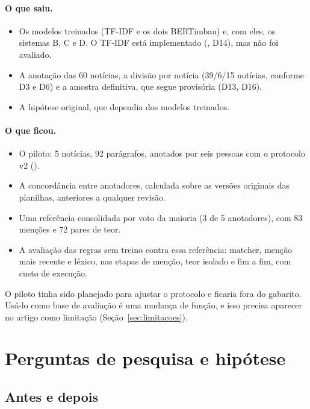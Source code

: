 \documentclass[11pt,a4paper]{article}
\begin{document}
\paragraph{O que saiu.}
\begin{itemize}
\item Os modelos treinados (TF-IDF e os dois BERTimbau) e, com eles, os sistemas B, C e D. O TF-IDF está implementado (, D14), mas não foi avaliado.
\item A anotação das 60 notícias, a divisão por notícia (39/6/15 notícias, conforme D3 e D6) e a amostra definitiva, que segue provisória (D13, D16).
\item A hipótese original, que dependia dos modelos treinados.
\end{itemize}

\paragraph{O que ficou.}
\begin{itemize}
\item O piloto: 5 notícias, 92 parágrafos, anotados por seis pessoas com o protocolo v2 ().
\item A concordância entre anotadores, calculada sobre as versões originais das planilhas, anteriores a qualquer revisão.
\item Uma referência consolidada por voto da maioria (3 de 5 anotadores), com 83 menções e 72 pares de teor.
\item A avaliação das regras sem treino contra essa referência: matcher, menção mais recente e léxico, nas etapas de menção, teor isolado e fim a fim, com custo de execução.
\end{itemize}

O piloto tinha sido planejado para ajustar o protocolo e ficaria fora do gabarito. Usá-lo como base de avaliação é uma mudança de função, e isso precisa aparecer no artigo como limitação (Seção~\ref{sec:limitacoes}).

\section{Perguntas de pesquisa e hipótese}\label{sec:perguntas}

\subsection{Antes e depois}
\end{document}
